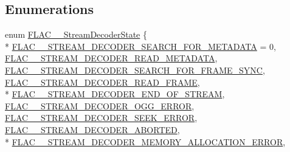 \subsection*{Enumerations}
\begin{DoxyCompactItemize}
\item 
enum \hyperlink{group__flac__stream__decoder_ga3adb6891c5871a87cd5bbae6c770ba2d}{F\+L\+A\+C\+\_\+\+\_\+\+Stream\+Decoder\+State} \{ \\*
\hyperlink{group__flac__stream__decoder_gga3adb6891c5871a87cd5bbae6c770ba2dacf4455f4f681a6737a553e10f614704a}{F\+L\+A\+C\+\_\+\+\_\+\+S\+T\+R\+E\+A\+M\+\_\+\+D\+E\+C\+O\+D\+E\+R\+\_\+\+S\+E\+A\+R\+C\+H\+\_\+\+F\+O\+R\+\_\+\+M\+E\+T\+A\+D\+A\+TA} = 0, 
\hyperlink{group__flac__stream__decoder_gga3adb6891c5871a87cd5bbae6c770ba2da4c1853ed1babdcede9a908e12cf7ccf7}{F\+L\+A\+C\+\_\+\+\_\+\+S\+T\+R\+E\+A\+M\+\_\+\+D\+E\+C\+O\+D\+E\+R\+\_\+\+R\+E\+A\+D\+\_\+\+M\+E\+T\+A\+D\+A\+TA}, 
\hyperlink{group__flac__stream__decoder_gga3adb6891c5871a87cd5bbae6c770ba2daccff915757978117720ba1613d088ddf}{F\+L\+A\+C\+\_\+\+\_\+\+S\+T\+R\+E\+A\+M\+\_\+\+D\+E\+C\+O\+D\+E\+R\+\_\+\+S\+E\+A\+R\+C\+H\+\_\+\+F\+O\+R\+\_\+\+F\+R\+A\+M\+E\+\_\+\+S\+Y\+NC}, 
\hyperlink{group__flac__stream__decoder_gga3adb6891c5871a87cd5bbae6c770ba2da06dc6158a51a8eb9537b65f2fbb6dc49}{F\+L\+A\+C\+\_\+\+\_\+\+S\+T\+R\+E\+A\+M\+\_\+\+D\+E\+C\+O\+D\+E\+R\+\_\+\+R\+E\+A\+D\+\_\+\+F\+R\+A\+ME}, 
\\*
\hyperlink{group__flac__stream__decoder_gga3adb6891c5871a87cd5bbae6c770ba2da28ce845052d9d1a780f4107e97f4c853}{F\+L\+A\+C\+\_\+\+\_\+\+S\+T\+R\+E\+A\+M\+\_\+\+D\+E\+C\+O\+D\+E\+R\+\_\+\+E\+N\+D\+\_\+\+O\+F\+\_\+\+S\+T\+R\+E\+AM}, 
\hyperlink{group__flac__stream__decoder_gga3adb6891c5871a87cd5bbae6c770ba2da3bc0343f47153c5779baf7f37f6e95cf}{F\+L\+A\+C\+\_\+\+\_\+\+S\+T\+R\+E\+A\+M\+\_\+\+D\+E\+C\+O\+D\+E\+R\+\_\+\+O\+G\+G\+\_\+\+E\+R\+R\+OR}, 
\hyperlink{group__flac__stream__decoder_gga3adb6891c5871a87cd5bbae6c770ba2daf2c6efcabdfe889081c2260e6681db49}{F\+L\+A\+C\+\_\+\+\_\+\+S\+T\+R\+E\+A\+M\+\_\+\+D\+E\+C\+O\+D\+E\+R\+\_\+\+S\+E\+E\+K\+\_\+\+E\+R\+R\+OR}, 
\hyperlink{group__flac__stream__decoder_gga3adb6891c5871a87cd5bbae6c770ba2dadb52ab4785bd2eb84a95e8aa82311cd5}{F\+L\+A\+C\+\_\+\+\_\+\+S\+T\+R\+E\+A\+M\+\_\+\+D\+E\+C\+O\+D\+E\+R\+\_\+\+A\+B\+O\+R\+T\+ED}, 
\\*
\hyperlink{group__flac__stream__decoder_gga3adb6891c5871a87cd5bbae6c770ba2da0d08c527252420813e6a6d6d3e19324a}{F\+L\+A\+C\+\_\+\+\_\+\+S\+T\+R\+E\+A\+M\+\_\+\+D\+E\+C\+O\+D\+E\+R\+\_\+\+M\+E\+M\+O\+R\+Y\+\_\+\+A\+L\+L\+O\+C\+A\+T\+I\+O\+N\+\_\+\+E\+R\+R\+OR}, 

\end{DoxyCompactItemize}
